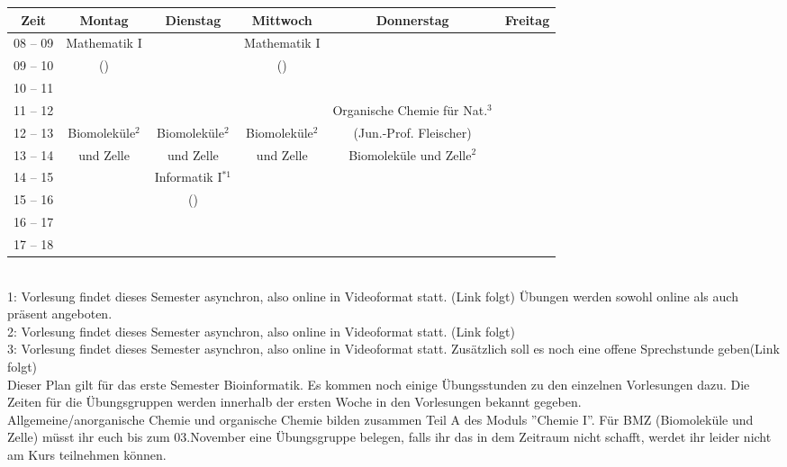 \begin{minipage}{\textwidth}
    \footnotesize
\begin{tabular}{|c|c|c|c|c|c|} \hline
Zeit      & 		Montag 		& Dienstag			& Mittwoch 			& Donnerstag 			& Freitag\\\hline\hline
08 -- 09  & 		Mathematik I 	&  				& Mathematik I 		        &  				&\\\cline{1-1}\cline{3-3}\cline{5-6}
09 -- 10  & 		(\Matheprof)    &   				 & (\Matheprof)                 &  				&\\\hline
10 -- 11  &				&				&				&				&\\\hline
11 -- 12 & 				&  				&				& Organische Chemie für Nat.$^3$ 		&\\\cline{1-4} \cline{6-6}
12 -- 13 & 		Biomoleküle$^2$	&  Biomoleküle$^2$              & Biomoleküle$^2$    & 		(Jun.-Prof. Fleischer)	& \\\cline{1-1}\cline{3-3}\cline{5-6}
13 -- 14 & 		und Zelle       & und Zelle 	                & und Zelle           & 	Biomoleküle und Zelle$^2$				&  \\\hline
14 -- 15 & 				& Informatik I$^{*1}$ &                				&  				& \\\cline{1-2}\cline{4-6}
15 -- 16 &			                & (\Infoprof) 	    & 					& 				&\\\cline{1-3} \cline{5-6}
16 -- 17 & & & & &\\\hline
17 -- 18 & & & & & \\\hline
\end{tabular}
\end{minipage}
\\
1: Vorlesung findet dieses Semester asynchron, also online in Videoformat statt. (Link folgt) Übungen werden sowohl online als auch präsent angeboten.\\
2: Vorlesung findet dieses Semester asynchron, also online in Videoformat statt. (Link folgt)\\
3: Vorlesung findet dieses Semester asynchron, also online in Videoformat statt. Zusätzlich soll es noch eine offene Sprechstunde geben(Link folgt)
\\
Dieser Plan gilt für das erste Semester Bioinformatik. Es kommen noch einige Übungsstunden
zu den einzelnen Vorlesungen dazu. Die Zeiten für die Übungsgruppen werden innerhalb der ersten Woche in den Vorlesungen bekannt gegeben.\\
Allgemeine/anorganische Chemie und organische Chemie bilden zusammen Teil A des Moduls ''Chemie I''.
Für BMZ (Biomoleküle und Zelle) müsst ihr euch bis zum 03.November eine Übungsgruppe belegen, falls ihr das in dem Zeitraum nicht schafft, werdet ihr leider nicht am Kurs teilnehmen können.


